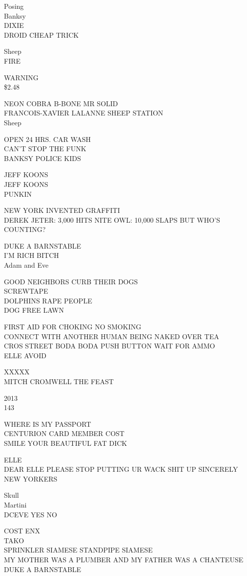 \documentclass[10pt,letterpaper]{article}
\begin{document}
Posing\\
Banksy\\
DIXIE\\
DROID CHEAP TRICK

Sheep\\
FIRE

WARNING\\
\$2.48

NEON COBRA B{-}BONE MR SOLID\\
FRANCOIS{-}XAVIER LALANNE SHEEP STATION\\
Sheep

OPEN 24 HRS. CAR WASH\\
CAN'T STOP THE FUNK\\
BANKSY POLICE KIDS

JEFF KOONS\\
JEFF KOONS\\
PUNKIN

NEW YORK INVENTED GRAFFITI\\
DEREK JETER: 3,000 HITS NITE OWL: 10,000 SLAPS BUT WHO'S COUNTING?

DUKE A BARNSTABLE\\
I'M RICH BITCH\\
Adam and Eve

GOOD NEIGHBORS CURB THEIR DOGS\\
SCREWTAPE\\
DOLPHINS RAPE PEOPLE\\
DOG FREE LAWN

FIRST AID FOR CHOKING NO SMOKING\\
CONNECT WITH ANOTHER HUMAN BEING NAKED OVER TEA\\
CROS STREET BODA BODA PUSH BUTTON WAIT FOR AMMO\\
ELLE AVOID

XXXXX\\
MITCH CROMWELL THE FEAST

2013\\
143

WHERE IS MY PASSPORT\\
CENTURION CARD MEMBER COST\\
SMILE YOUR BEAUTIFUL FAT DICK

ELLE\\
DEAR ELLE PLEASE STOP PUTTING UR WACK SHIT UP SINCERELY NEW YORKERS

Skull\\
Martini\\
DCEVE YES NO

COST ENX\\
TAKO\\
SPRINKLER SIAMESE STANDPIPE SIAMESE\\
MY MOTHER WAS A PLUMBER AND MY FATHER WAS A CHANTEUSE DUKE A BARNSTABLE
\end{document}
